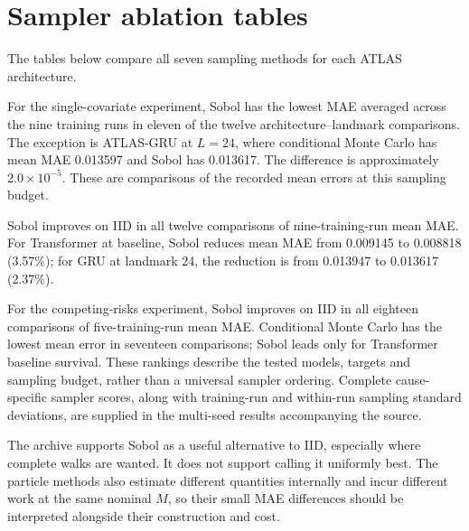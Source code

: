 \section{Sampler ablation tables}\label{supp:ablation}
The tables below compare all seven sampling methods for each ATLAS architecture.



For the single-covariate experiment, Sobol has the lowest MAE averaged across the nine training runs in eleven of the twelve architecture--landmark comparisons. The exception is ATLAS-GRU at $L=24$, where conditional Monte Carlo has mean MAE 0.013597 and Sobol has 0.013617. The difference is approximately $2.0\times10^{-5}$. These are comparisons of the recorded mean errors at this sampling budget.

Sobol improves on IID in all twelve comparisons of nine-training-run mean MAE. For Transformer at baseline, Sobol reduces mean MAE from 0.009145 to 0.008818 (3.57\%); for GRU at landmark 24, the reduction is from 0.013947 to 0.013617 (2.37\%).



For the competing-risks experiment, Sobol improves on IID in all eighteen comparisons of five-training-run mean MAE. Conditional Monte Carlo has the lowest mean error in seventeen comparisons; Sobol leads only for Transformer baseline survival. These rankings describe the tested models, targets and sampling budget, rather than a universal sampler ordering. Complete cause-specific sampler scores, along with training-run and within-run sampling standard deviations, are supplied in the multi-seed results accompanying the source.

The archive supports Sobol as a useful alternative to IID, especially where complete walks are wanted. It does not support calling it uniformly best. The particle methods also estimate different quantities internally and incur different work at the same nominal $M$, so their small MAE differences should be interpreted alongside their construction and cost.
